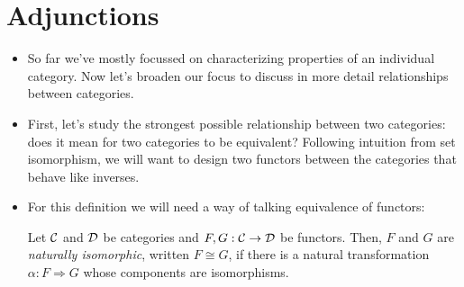 \chapter{Adjunctions}

\begin{itemize}
  \item So far we've mostly focussed on characterizing properties 
  of an individual category. Now let's broaden our focus to discuss 
  in more detail
  relationships between categories.
  \item First, let's study the strongest possible relationship between
  two categories: does it mean for two categories to be equivalent? 
  Following intuition from set isomorphism, we will want to design 
  two functors between the categories that behave like inverses.
  \item For this definition we will need a way of talking equivalence 
  of functors:
  \begin{definition}
    Let $\mathcal C$ and $\mathcal D$ be categories and $F, G : \mathcal C \to \mathcal D$ 
    be functors. Then, $F$ and $G$ are \emph{naturally isomorphic},
    written $F \cong G$, if there is a natural transformation $\alpha : F \Rightarrow G$
    whose components are isomorphisms.

  \end{definition}




\end{itemize}

